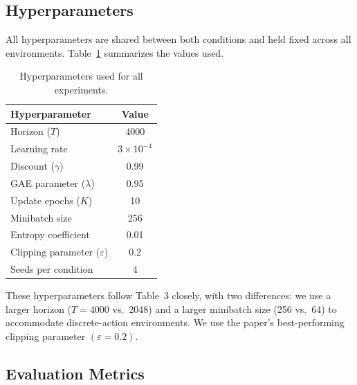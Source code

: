 \documentclass{article}
\begin{document}
\subsection{Hyperparameters}

All hyperparameters are shared between both conditions and held fixed across all environments. Table~\ref{tab:hyperparams} summarizes the values used.

\begin{table}[h]
\caption{Hyperparameters used for all experiments.}
\label{tab:hyperparams}
\begin{center}
\begin{tabular}{lc}
\toprule
\textbf{Hyperparameter} & \textbf{Value} \\
\midrule
Horizon ($T$)                        & 4000               \\
Learning rate                        & $3 \times 10^{-4}$ \\
Discount ($\gamma$)                  & 0.99               \\
GAE parameter ($\lambda$)            & 0.95               \\
Update epochs ($K$)                  & 10                 \\
Minibatch size                       & 256                \\
Entropy coefficient                  & 0.01               \\
Clipping parameter ($\varepsilon$)   & 0.2                \\
Seeds per condition                  & 4                  \\
\bottomrule
\end{tabular}
\end{center}
\end{table}

These hyperparameters follow \citet{schulman2017ppo} Table~3 closely, with two differences: we use a larger horizon ($T=4000$ vs.\ 2048) and a larger minibatch size (256 vs.\ 64) to accommodate discrete-action environments. We use the paper's best-performing clipping parameter $(\varepsilon=0.2)$.

\subsection{Evaluation Metrics}
\end{document}
